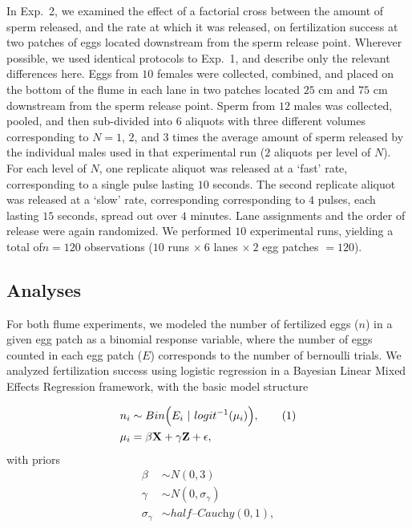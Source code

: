 \documentclass{article}
\newcommand\numberthis{\addtocounter{equation}{1}\tag{\theequation}}
\begin{document}
	In Exp.~2, we examined the effect of a factorial cross between the amount of sperm released, and the rate at which it was released, on fertilization success at two patches of eggs located downstream from the sperm release point. Wherever possible, we used identical protocols to Exp.~1, and describe only the relevant differences here. Eggs from $10$ females were collected, combined, and placed on the bottom of the flume in each lane in two patches located $25$ cm and $75$ cm downstream from the sperm release point. Sperm from $12$ males was collected, pooled, and then sub-divided into $6$ aliquots with three different volumes corresponding to $N = 1$, $2$, and $3$ times the average amount of sperm released by the individual males used in that experimental run ($2$ aliquots per level of $N$). For each level of $N$, one replicate aliquot was released at a `fast' rate, corresponding to a single pulse lasting $10$ seconds. The second replicate aliquot was released at a `slow' rate, corresponding corresponding to $4$ pulses, each lasting $15$ seconds, spread out over $4$ minutes. Lane assignments and the order of release were again randomized. We performed $10$ experimental runs, yielding a total of$n=120$ observations ($10$ runs $\times~6$ lanes $\times~2$ egg patches $= 120$).

	\subsection*{Analyses}
	For both flume experiments, we modeled the number of fertilized eggs ($n$) in a given egg patch as a binomial response variable, where the number of eggs counted in each egg patch ($E$) corresponds to the number of bernoulli trials. We analyzed fertilization success using logistic regression in a Bayesian Linear Mixed Effects Regression framework, with the basic model structure 

\begin{align*}
	n_i   &\sim Bin\Big(E_i~|~logit^{-1}(\mu_i)\Big), \numberthis\\
	\mu_i &= \beta \mathbf{X} + \gamma \mathbf{Z} + \epsilon,
\end{align*}
\noindent{} with priors
\begin{align*}
	\beta           &\sim N(0,3) \\
	\gamma          &\sim N(0,\sigma_{\gamma}) \\
	\sigma_{\gamma} &\sim \mathit{half} \text{--}\textit{Cauchy}(0,1),
\end{align*}
\end{document}
